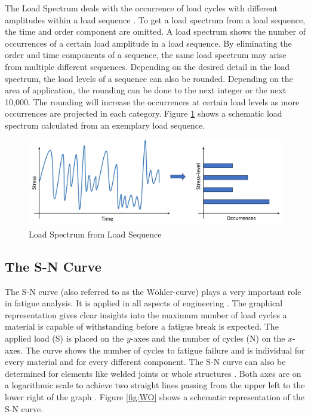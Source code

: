 The Load Spectrum deals with the occurrence of load cycles with different amplitudes within a load sequence \cite{Facchinetti}. To get a load spectrum from a load sequence, the time and order component are omitted. A load spectrum shows the number of occurrences of a certain load amplitude in a load sequence.
By eliminating the order and time components of a sequence, the same load spectrum may arise from multiple different sequences. Depending on the desired detail in the load spectrum, the load levels of a sequence can also be rounded. Depending on the area of application, the rounding can be done to the next integer or the next 10,000.
\newpage
The rounding will increase the occurrences at certain load levels as more occurrences are projected in each category. 
Figure \ref{fig:LS} shows a schematic load spectrum calculated from an exemplary load sequence.


\begin{figure}[H]
	\centering
	\includegraphics[width=1\linewidth]{IMGs/Spectrum.png}
	\caption{Load Spectrum from Load Sequence}
	\label{fig:LS}
\end{figure}

\subsection{The S-N Curve}\label{sn}
The S-N curve (also referred to as the Wöhler-curve) plays a very important role in fatigue analysis. It is applied in all aspects of engineering \cite{Burhan,Pungo}. 
The graphical representation gives clear insights into the maximum number of load cycles a material is capable of withstanding before a fatigue break is expected.
The applied load (S) is placed on the \(y\)-axes and the number of cycles (N) on the \(x\)-axes. The curve shows the number of cycles to fatigue failure and is individual for every material and for every different component.
The S-N curve can also be determined for elements like welded joints or whole structures \cite{Baptista, Dong}.
Both axes are on a logarithmic scale to achieve two straight lines passing from the upper left to the lower right of the graph \cite{Little}. Figure \ref{fig:WO} shows a schematic representation of the S-N curve. 


